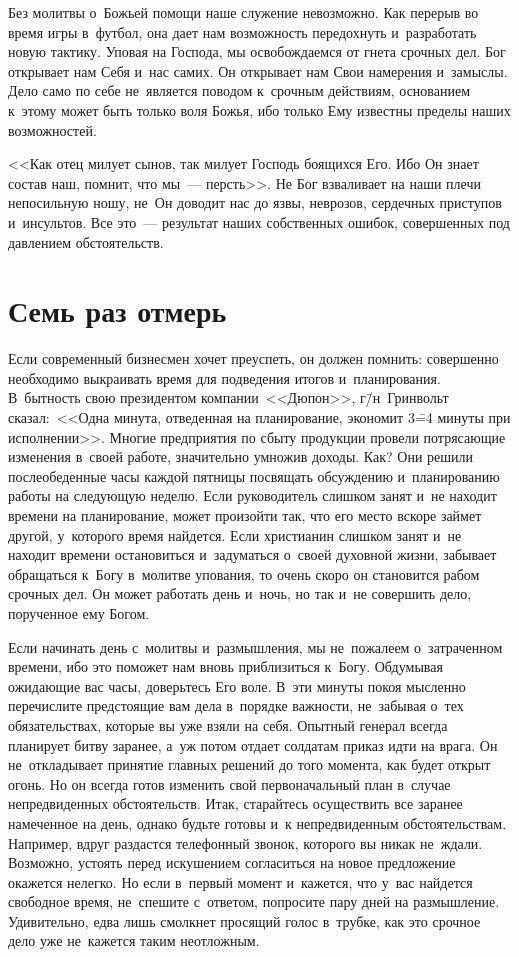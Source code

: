 \documentclass[12pt,article,a4paper,fittopage]{ncc}
\begin{document}
\begin{multicols}{2}
Без молитвы о~Божьей помощи наше служение невозможно. Как перерыв во время игры в~футбол, она дает нам возможность передохнуть и~разработать новую тактику. Уповая на Господа, мы освобождаемся от гнета срочных дел. Бог открывает нам Себя и~нас самих. Он открывает нам Свои намерения и~замыслы. Дело само по себе не~является поводом к~срочным действиям, основанием к~этому может быть только воля Божья, ибо только Ему известны пределы наших возможностей. 

 <<Как отец милует сынов, так милует Господь боящихся Его. Ибо Он знает состав наш, помнит, что мы~--- персть>>. 
Не Бог взваливает на наши плечи непосильную ношу, не~Он доводит нас до язвы, неврозов, сердечных приступов и~инсультов. Все это~--- результат наших собственных ошибок, совершенных под давлением обстоятельств. 

\section*{Семь раз отмерь}

Если современный бизнесмен хочет преуспеть, он должен помнить: совершенно необходимо выкраивать время для подведения итогов и~планирования. В~бытность свою президентом компании\ <<Дюпон>>, г\=/н~Гринвольт сказал:\ <<Одна минута, отведенная на планирование, экономит 3\==4 минуты при исполнении>>. Многие предприятия по сбыту продукции провели потрясающие изменения в~своей работе, значительно умножив доходы. Как? Они решили послеобеденные часы каждой пятницы посвящать обсуждению и~планированию работы на следующую неделю. Если руководитель слишком занят и~не находит времени на планирование, может  произойти так, что его место вскоре займет другой, у~которого время найдется. Если христианин слишком занят и~не находит времени остановиться и~задуматься о~своей духовной жизни, забывает обращаться к~Богу в~молитве упования, то очень скоро он становится рабом срочных дел. Он может работать день и~ночь, но так и~не совершить дело, порученное ему Богом.

Если начинать день с~молитвы и~размышления, мы не~пожалеем о~затраченном времени, ибо это поможет нам вновь приблизиться к~Богу. Обдумывая ожидающие вас часы, доверьтесь Его воле. В~эти минуты покоя мысленно перечислите предстоящие вам дела в~порядке важности, не~забывая о~тех обязательствах, которые вы уже взяли на себя. Опытный генерал всегда планирует битву заранее, а~уж потом отдает солдатам приказ идти на врага. Он не~откладывает принятие главных решений до того момента, как будет открыт огонь. Но он всегда готов изменить свой первоначальный план в~случае непредвиденных обстоятельств. Итак, старайтесь осуществить все заранее намеченное на день, однако будьте готовы и~к непредвиденным обстоятельствам. Например, вдруг раздастся телефонный звонок, которого вы никак не~ждали. Возможно, устоять перед искушением согласиться на новое предложение окажется нелегко. Но если в~первый момент и~кажется, что у~вас найдется свободное время, не~спешите с~ответом, попросите пару дней на размышление. Удивительно, едва лишь смолкнет просящий голос в~трубке, как это срочное дело уже не~кажется таким неотложным.


\end{multicols}
\end{document}
